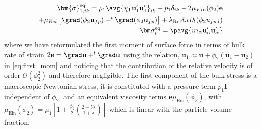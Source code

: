 \begin{align*}
    \bm{\sigma}^\text{eq}_{1,ik} =
    \rho_1\avg{\chi_1\textbf{u}_1'\textbf{u}_1'}_{ik} 
    + p_1 \delta_{ik}
    - 2 \mu_{Ein}(\phi_2) \textbf{e}\\
    + \mu_{Rel} \left[\grad (\phi_2\textbf{u}_{fp}) + ^t\grad (\phi_2\textbf{u}_{fp})\right]
    + \lambda_\text{Rel}
        \delta_{ik} \partial_l(\phi_2 u_{fp,l})\\
    \bm\sigma_p^\text{eq}
    = \pavg{m_\alpha\textbf{u}_\alpha'\textbf{u}_\alpha'}
\end{align*}
where we have reformulated the first moment of surface force in terms of bulk rate of strain $2\textbf{e} = \grad \textbf{u} +  ^t \grad \textbf{u}$ using the relation, $\textbf{u}_1 \approx \textbf{u} + \phi_2 (\textbf{u}_1 - \textbf{u}_2)$ in \ref{eq:first_mom} and noticing that the contribution of the relative velocity is of order $\mathcal{O}(\phi_2^2)$ and therefore negligible. 
The first component of the bulk stress is a macroscopic Newtonian stress, it is constituted with a pressure term $p_1 \textbf{I}$ independent of $\phi_2$, and an equivalent viscosity terms $\textbf{e}\mu_\text{Ein}(\phi_2)$, with $\mu_\text{Ein}(\phi_2) = \mu_1\left[1 + \frac{\phi_2}{2} \left(\frac{2+5\lambda}{1+\lambda}\right)\right]$ which is linear with the particle volume fraction. 
